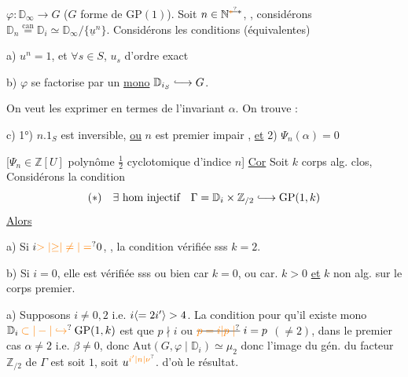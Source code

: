  $\varphi:\mathbb D_\infty\longrightarrow G$ ($G$ forme de $\mathrm{GP}(1)$).  Soit $n\in\mathbb N^{\deleted{\unsure{*}}*}$, , considérons $\mathbb D_{n}\overset{\text{can}}{=}\mathbb D_i\simeq\mathbb D_\infty/\{\underline u^n\}$. Considérons les conditions (équivalentes)

a) $u^n=1$, et $\forall s\in S$, $u_s$ d'ordre  exact \deleted{[Si $n=0$, il faut dire : $u_s$ d'ordre $\infty$]}

b) $\varphi$ se factorise par un \uline{mono} $\mathbb D_{i_S}\lhook\joinrel\longrightarrow G$.

On veut les exprimer en termes de l'invariant $\alpha$. On trouve : 


c) 1°) $n.1_S$ est inversible, \uline{ou} $n$     est premier impair ,  \uline{et} 2) $\Psi_n(\alpha)=0$

[$\Psi_n\in\mathbb Z[U]$ polynôme $\frac12$ cyclotomique d'indice $n$]
\uline{Cor} Soit $k$ corps alg. clos,  Considérons la condition
\[
(\ast)\quad\exists\ \text{hom injectif}\quad\Gamma=\mathbb D_i\times\mathbb Z_{/2}\lhook\joinrel\longrightarrow\mathrm{GP}(1,k)
\]
\uline{Alors}

a) Si $i\unsure{>|{\geq}|\ne|=}0$, , la condition   vérifiée sss  $k=2$.

b) Si $i=0$, elle est vérifiée sss ou bien car $k=0$, ou  car. $k>0$ \uline{et} $k$ non alg. sur le corps premier.


a) Supposons $i\ne0,2$ i.e. $i\inserted{=2i'}>4$. La condition pour qu'il existe mono $\mathbb D_i\mathbin{\unsure{\subset|-|\hookrightarrow}}\mathrm{GP}(1,k)$ est que $p\nmid i$ ou $\deleted{\unsure{p=i|p\mid}}\ i=p$ $(\ne2)$, dans le premier cas $\alpha\ne2$ i.e. $\beta\ne0$, donc $\mathrm{Aut}(G,\varphi\mid\mathbb D_i)\simeq\mu_2$ \deleted{\unsure{$=\mu$}} donc l'image du gén. \inserted{$\sigma$} du facteur $\mathbb Z_{/2}$ de $\Gamma$ est soit $1$,  soit $u^{\unsure{i'|n|\nu}}$. d'où le résultat.

